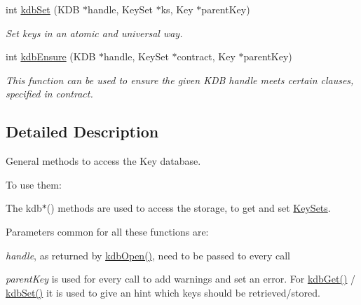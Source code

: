 \begin{DoxyCompactItemize}
int \mbox{\hyperlink{group__kdb_ga11436b058408f83d303ca5e996832bcf}{kdb\+Set}} (K\+DB $\ast$handle, Key\+Set $\ast$ks, Key $\ast$parent\+Key)
\begin{DoxyCompactList}\small\item\em Set keys in an atomic and universal way. \end{DoxyCompactList}\item 
int \mbox{\hyperlink{group__kdb_ga0955373877575fa21275891518f8ab31}{kdb\+Ensure}} (K\+DB $\ast$handle, Key\+Set $\ast$contract, Key $\ast$parent\+Key)
\begin{DoxyCompactList}\small\item\em This function can be used to ensure the given K\+DB {\ttfamily handle} meets certain clauses, specified in {\ttfamily contract}. \end{DoxyCompactList}\end{DoxyCompactItemize}


\subsection{Detailed Description}
General methods to access the Key database. 

To use them\+: 
\begin{DoxyCode}{0}
\DoxyCodeLine{\textcolor{preprocessor}{\#include <kdb.h>}}
\end{DoxyCode}


The kdb$\ast$() methods are used to access the storage, to get and set \mbox{\hyperlink{group__keyset}{Key\+Sets}}.

Parameters common for all these functions are\+:


\begin{DoxyItemize}
\item {\itshape handle}, as returned by \mbox{\hyperlink{group__kdb_ga6808defe5870f328dd17910aacbdc6ca}{kdb\+Open()}}, need to be passed to every call
\item {\itshape parent\+Key} is used for every call to add warnings and set an error. For \mbox{\hyperlink{group__kdb_ga28e385fd9cb7ccfe0b2f1ed2f62453a1}{kdb\+Get()}} / \mbox{\hyperlink{group__kdb_ga11436b058408f83d303ca5e996832bcf}{kdb\+Set()}} it is used to give an hint which keys should be retrieved/stored.
\end{DoxyItemize}

